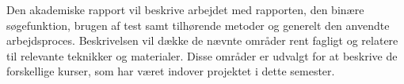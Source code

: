 Den akademiske rapport vil beskrive arbejdet med rapporten, den binære søgefunktion, brugen af test samt tilhørende metoder og generelt den anvendte arbejdsproces. Beskrivelsen vil dække de nævnte områder rent fagligt og relatere til relevante teknikker og materialer. Disse områder er udvalgt for at beskrive de forskellige kurser, som har været indover projektet i dette semester.